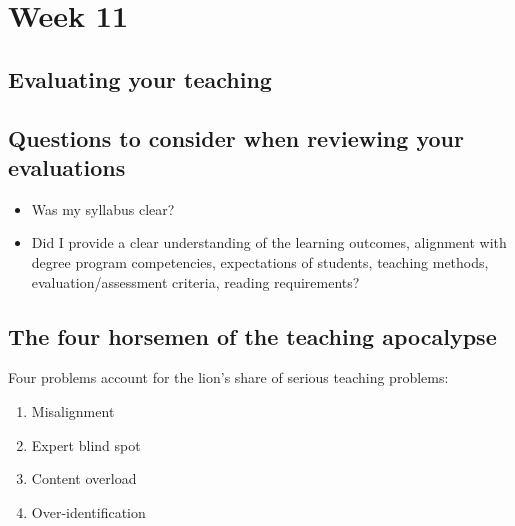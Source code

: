 \section{Week 11}
\label{sec:week-11}

\subsection{Evaluating your teaching}
\label{sec:eval-your-teach}

\subsection{Questions to consider when reviewing your evaluations}
\label{sec:quest-cons-when}

\begin{itemize}
\item Was my syllabus clear? 
\item Did I provide a clear understanding of the learning outcomes, alignment with degree program competencies, expectations of students, teaching methods, evaluation/assessment criteria, reading requirements?
\end{itemize}

\subsection{The four horsemen of the teaching apocalypse}
\label{sec:four-hors-teach}

Four problems account for the lion's share of serious teaching problems:
\begin{enumerate}
\item Misalignment
\item Expert blind spot
\item Content overload
\item Over-identification
\end{enumerate}

